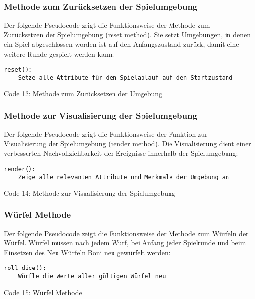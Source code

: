 \subsubsection{Methode zum Zurücksetzen der Spielumgebung}
\begin{minipage}{\linewidth}
Der folgende Pseudocode zeigt die Funktionsweise der Methode zum Zurücksetzen der Spielumgebung (reset method). Sie setzt Umgebungen, in denen ein Spiel abgeschlossen worden ist auf den Anfangszustand zurück, damit eine weitere Runde gespielt werden kann:
\vspace{0.5cm}
\begin{lstlisting}
reset():
	Setze alle Attribute für den Spielablauf auf den Startzustand
\end{lstlisting}
Code 13: Methode zum Zurücksetzen der Umgebung\\
\end{minipage}

\subsubsection{Methode zur Visualisierung der Spielumgebung}
\begin{minipage}{\linewidth}
Der folgende Pseudocode zeigt die Funktionsweise der Funktion zur Visualisierung der Spielumgebung (render method). Die Visualisierung dient einer verbesserten Nachvollziehbarkeit der Ereignisse innerhalb der Spielumgebung:
\vspace{0.5cm}
\begin{lstlisting}
render():
	Zeige alle relevanten Attribute und Merkmale der Umgebung an
\end{lstlisting}
Code 14: Methode zur Visualisierung der Spielumgebung\\
\end{minipage}

\subsubsection{Würfel Methode}
\begin{minipage}{\linewidth}
Der folgende Pseudocode zeigt die Funktionsweise der Methode zum Würfeln der Würfel. Würfel müssen nach jedem Wurf, bei Anfang jeder Spielrunde und beim Einsetzen des Neu Würfeln Boni neu gewürfelt werden:
\vspace{0.5cm}
\begin{lstlisting}
roll_dice():
	Würfle die Werte aller gültigen Würfel neu
\end{lstlisting}
Code 15: Würfel Methode\\
\end{minipage}

